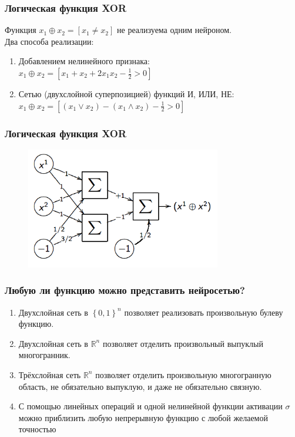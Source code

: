 \documentclass[10pt]{beamer}
\begin{document}
\begin{frame}\frametitle{Логическая функция XOR}
	Функция $x_1 \oplus x_2 = [x_1 \neq x_2]$ не реализуема одним нейроном.\\
	
	Два способа реализации:\\
	\begin{enumerate}[--]
		\item Добавлением нелинейного признака:\\
		$x_1 \oplus x_2 = [x_1 + x_2 + 2x_1x_2 - \frac{1}{2} > 0]$
		\item Сетью (двухслойной суперпозицией) функций И, ИЛИ, НЕ:\\
		$x_1 \oplus x_2 = [(x_1 \vee x_2) - (x_1 \wedge x_2) - \frac{1}{2} > 0]$
		\end{enumerate}
\end{frame}

\begin{frame}\frametitle{Логическая функция XOR}
	\begin{figure}[htbp]
	  \includegraphics[height=150pt, keepaspectratio = true]{images/XOR1}   
	\end{figure}
\end{frame}

\begin{frame}\frametitle{Любую ли функцию можно представить нейросетью?}
	\begin{enumerate}[--]
		\item Двухслойная сеть в $\left\{0, 1 \right\}^n$ позволяет реализовать произвольную булеву функцию.
		\item Двухслойная сеть в $\mathbb{R}^n$ позволяет отделить произвольный выпуклый многогранник.
		\item Трёхслойная сеть $\mathbb{R}^n$ позволяет отделить произвольную многогранную область, не обязательно выпуклую, и даже не обязательно связную.
		\item С помощью линейных операций и одной нелинейной функции активации $\sigma$ можно приблизить любую непрерывную функцию с любой желаемой точностью
	\end{enumerate}
\end{frame}
\end{document}

